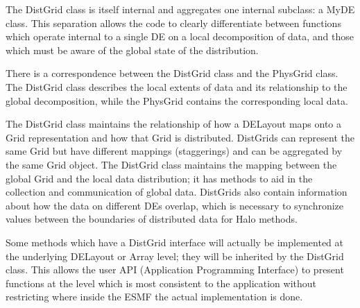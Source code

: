 



The DistGrid class is itself internal and aggregates one internal
subclass: a MyDE class.  This separation allows the code to clearly
differentiate between functions which operate internal to a single DE
on a local decomposition of data, and those which must be aware of the
global state of the distribution.

There is a correspondence between the DistGrid class and the PhysGrid
class.  The DistGrid class describes the local extents of data and
its relationship to the global decomposition, while the PhysGrid contains
the corresponding local data.

The DistGrid class maintains the relationship of how a DELayout maps onto
a Grid representation and how that Grid is distributed.  DistGrids can
represent the same Grid but have different mappings (staggerings) and can
be aggregated by the same Grid object. The DistGrid class maintains the
mapping between the global Grid and the local data distribution;  it has
methods to aid in the collection and communication of global data.
DistGrids also contain information about how the data on different DEs
overlap, which is necessary to synchronize values between the boundaries
of distributed data for Halo methods.

Some methods which have a DistGrid interface will actually be
implemented at the underlying DELayout or Array level; they
will be inherited by the DistGrid class.  This allows the user
API (Application Programming Interface) to present functions at
the level which is most consistent to the application without
restricting where inside the ESMF the actual implementation
is done.
